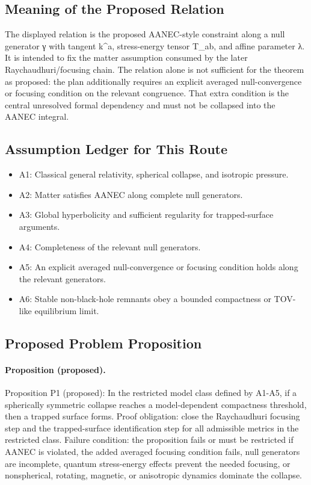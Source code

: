 \documentclass[conference]{IEEEtran}
\begin{document}
\subsection{Meaning of the Proposed Relation}
The displayed relation is the proposed AANEC-style constraint along a null generator γ with tangent k\textasciicircum{}a, stress-energy tensor T\_ab, and affine parameter λ. It is intended to fix the matter assumption consumed by the later Raychaudhuri/focusing chain. The relation alone is not sufficient for the theorem as proposed: the plan additionally requires an explicit averaged null-convergence or focusing condition on the relevant congruence. That extra condition is the central unresolved formal dependency and must not be collapsed into the AANEC integral.~\cite{cite_0ed84243cf171bc4}

\subsection{Assumption Ledger for This Route}
\begin{itemize}
\item A1: Classical general relativity, spherical collapse, and isotropic pressure.
\item A2: Matter satisfies AANEC along complete null generators.
\item A3: Global hyperbolicity and sufficient regularity for trapped-surface arguments.
\item A4: Completeness of the relevant null generators.
\item A5: An explicit averaged null-convergence or focusing condition holds along the relevant generators.
\item A6: Stable non-black-hole remnants obey a bounded compactness or TOV-like equilibrium limit.
\end{itemize}

\subsection{Proposed Problem Proposition}
\paragraph{Proposition (proposed).} Proposition P1 (proposed): In the restricted model class defined by A1-A5, if a spherically symmetric collapse reaches a model-dependent compactness threshold, then a trapped surface forms. Proof obligation: close the Raychaudhuri focusing step and the trapped-surface identification step for all admissible metrics in the restricted class. Failure condition: the proposition fails or must be restricted if AANEC is violated, the added averaged focusing condition fails, null generators are incomplete, quantum stress-energy effects prevent the needed focusing, or nonspherical, rotating, magnetic, or anisotropic dynamics dominate the collapse.
\end{document}
